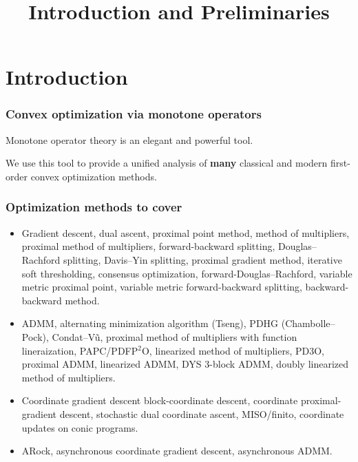 \documentclass[10pt,mathserif]{beamer}
\title{\large \bfseries Introduction and Preliminaries}
\begin{document}
\frame{
\thispagestyle{empty}
\titlepage
}


\section{Introduction}
\begin{frame}
\frametitle{Convex optimization via monotone operators}
Monotone operator theory is an elegant and powerful tool.

\vspace{0.2in}

We use this tool to provide a unified analysis of \textbf{many} classical and modern first-order convex optimization methods.

\end{frame}

\begin{frame}
\frametitle{Optimization methods to cover}
\begin{itemize}
\item[\S2] Gradient descent,
dual ascent, proximal point method, method of multipliers,
proximal method of multipliers, forward-backward splitting, Douglas--Rachford splitting, Davis--Yin splitting, 
proximal gradient method, iterative soft thresholding, consensus optimization, forward-Douglas--Rachford, variable metric proximal point, variable metric forward-backward splitting,
backward-backward method.
\item[\S3] 
ADMM,
alternating minimization algorithm (Tseng),
PDHG (Chambolle--Pock),
Condat--V\~u,
proximal method of multipliers with function lineraization,
PAPC/PDFP$^2$O,
linearized method of multipliers,
PD3O,
proximal ADMM,
linearized ADMM,
DYS 3-block ADMM,
doubly linearized method of multipliers.
\item[\S5]
Coordinate gradient descent
block-coordinate descent,
coordinate proximal-gradient descent,
stochastic dual coordinate ascent,
MISO/finito,
coordinate updates on conic programs.
\item[\S6] 
ARock,
asynchronous coordinate gradient descent,
asynchronous ADMM.
\end{itemize}
\end{frame}
\end{document}
